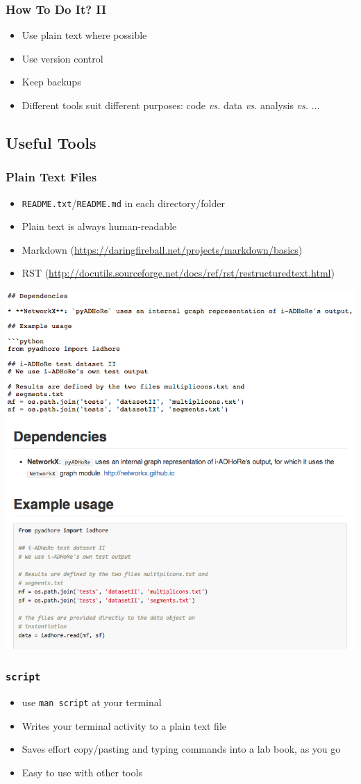 \documentclass[table]{beamer}
\begin{document}
   \begin{frame}
     \frametitle{How To Do It? II}
     \begin{itemize}
	   \item Use plain text where possible
	   \item Use version control
	   \item Keep backups
	   \item Different tools suit different purposes: code \textit{vs.} data \textit{vs.} analysis \textit{vs.} $\ldots$
	\end{itemize}
   \end{frame}
   
   
   \subsection{Useful Tools}
   \begin{frame}
     \frametitle{Plain Text Files}
     \begin{itemize}
       \item \texttt{README.txt}/\texttt{README.md} in each directory/folder
       \item Plain text is always human-readable
       \item Markdown (\url{https://daringfireball.net/projects/markdown/basics})
       \item RST (\url{http://docutils.sourceforge.net/docs/ref/rst/restructuredtext.html})
     \end{itemize}
    \includegraphics[width=.4\textwidth]{images/markdown_before}
	\includegraphics[width=.4\textwidth]{images/markdown_after}
   \end{frame}
   
   \begin{frame}
     \frametitle{\texttt{script}}
     \begin{itemize}
       \item use \texttt{man script} at your terminal
       \item Writes your terminal activity to a plain text file
       \item Saves effort copy/pasting and typing commands into a lab book, as you go
       \item Easy to use with other tools 
     \end{itemize}
   \end{frame}   
   
\end{document}
